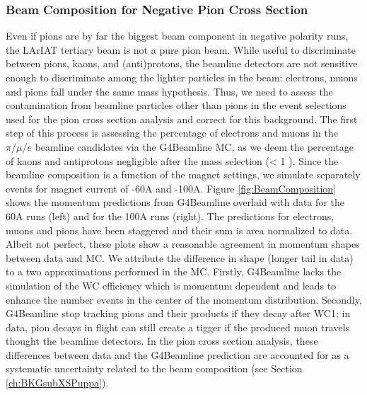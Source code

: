 \subsubsection{Beam Composition for Negative Pion Cross Section}
Even if pions are by far the biggest beam component in negative polarity runs, the LArIAT tertiary beam is not a pure pion beam. While useful to discriminate between pions, kaons, and (anti)protons, the beamline detectors are not sensitive enough to  discriminate among the lighter particles in the beam: electrons, muons and pions fall under the same mass hypothesis. Thus, we need to assess the contamination from beamline particles other than pions in the event selections used for the pion cross section analysis and correct for this background. The first step of this process is assessing the percentage of electrons and muons in the $\pi/\mu/e$ beamline candidates via the G4Beamline MC, as we deem the percentage of kaons and antiprotons negligible after the mass selection (< 1 \textperthousand). 
Since the beamline composition is a function of the magnet settings, we simulate separately events for magnet current of -60A and -100A. 
Figure \ref{fig:BeamComposition} shows the momentum predictions from G4Beamline overlaid with data for the 60A runs (left) and for the 100A runs (right). The predictions for electrons, muons and pions have been staggered and their sum is area normalized to data. Albeit not perfect, these plots show a reasonable agreement in momentum shapes between data and MC.  We attribute the difference in shape (longer tail in data) to a two approximations performed in the MC. Firstly, G4Beamline lacks the simulation of the WC efficiency which is momentum dependent and leads to enhance the number events in the center of the momentum distribution. Secondly, G4Beamline stop tracking pions and their products if they decay after WC1; in data, pion decays in flight can still create a tigger if the produced muon travels thought the beamline detectors. In the pion cross section analysis, these differences between data and the G4Beamline prediction are accounted for as a systematic uncertainty related to the beam composition (see Section \ref{ch:BKGsubXSPuppa}).


